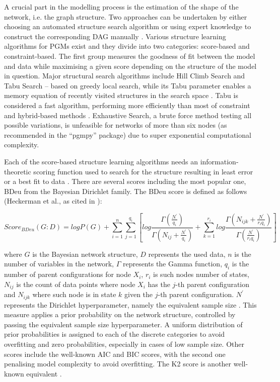 \documentclass[12pt, letterpaper]{article}
\begin{document}
A crucial part in the modelling process is the estimation of the shape of the network, i.e. the graph structure. Two approaches can be undertaken by either choosing an automated structure search algorithm or using expert knowledge to construct the corresponding DAG manually \parencite{kitson2023}. Various structure learning algorithms for PGMs exist and they divide into two categories: score-based and constraint-based. The first group measures the goodness of fit between the model and data while maximising a given score depending on the structure of the model in question. Major structural search algorithms include Hill Climb Search and Tabu Search – based on greedy local search, while its Tabu parameter enables a memory equation of recently visited structures in the search space \parencite{kitson2023}. Tabu is considered a fast algorithm, performing more efficiently than most of constraint and hybrid-based methods \parencite{scutari2019}. Exhaustive Search, a brute force method testing all possible variations, is unfeasible for networks of more than six nodes (as recommended in the “pgmpy” package) due to super exponential computational complexity.

Each of the score-based structure learning algorithms needs an information-theoretic scoring function used to search for the structure resulting in least error or a best fit to data \parencite{kitson2023}. There are several scores including the most popular one, BDeu from the Bayesian Dirichlet family. The BDeu score is defined as follows (Heckerman et al., as cited in \cite{kitson2023}):

\begin{equation}
{Score}_{BDeu}\left(G:D\right)=logP\left(G\right)+\sum_{i=1}^{n}\sum_{j=1}^{q_i}\left[log\frac{\Gamma(\frac{N^\prime}{q_i})}{\Gamma(N_{ij}+\frac{N^\prime}{q_i})}+\sum_{k=1}^{r_i}{log\frac{\Gamma(N_{ijk}+\frac{N^\prime}{r_iq_i})}{\Gamma(\frac{N^\prime}{r_iq_i})}}\right]
\end{equation}

where $G$ is the Bayesian network structure, $D$ represents the used data, $n$ is the number of variables in the network, $\Gamma$ represents the Gamma function, $q_i$ is the number of parent configurations for node $X_i$, $r_i$ is such nodes number of states, $N_{ij}$ is the count of data points where node $X_i$ has the $j$-th parent configuration and $N_{ijk}$ where such node is in state $k$ given the $j$-th parent configuration. $N^\prime$ represents the Dirichlet hyperparameter, namely the equivalent sample size \parencite{kitson2023}. This measure applies a prior probability on the network structure, controlled by passing the equivalent sample size hyperparameter. A uniform distribution of prior probabilities is assigned to each of the discrete categories to avoid overfitting and zero probabilities, especially in cases of low sample size. Other scores include the well-known AIC and BIC scores, with the second one penalising model complexity to avoid overfitting. The K2 score is another well-known equivalent \parencite{kitson2023}.
\end{document}
